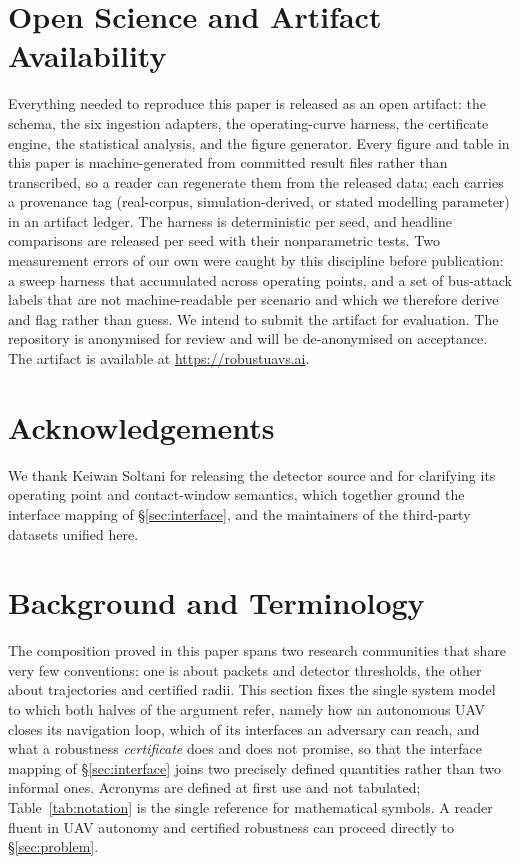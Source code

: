 \section{Open Science and Artifact Availability}
\label{sec:openscience}
Everything needed to reproduce this paper is released as an open artifact: the
schema, the six ingestion adapters, the operating-curve harness, the
certificate engine, the statistical analysis, and the figure generator. Every
figure and table in this paper is machine-generated from committed result files
rather than transcribed, so a reader can regenerate them from the released data;
each carries a provenance tag (real-corpus, simulation-derived, or stated
modelling parameter) in an artifact ledger. The harness is deterministic per
seed, and headline comparisons are released per seed with their nonparametric
tests. Two measurement errors of our own were caught by this discipline before
publication: a sweep harness that accumulated across operating points, and a set
of bus-attack labels that are not machine-readable per scenario and which we
therefore derive and flag rather than guess. We intend to submit the artifact for evaluation.
\ifanon
The repository is anonymised for review and will be de-anonymised on acceptance.
\else
The artifact is available at \url{https://robustuavs.ai}.
\fi

\ifanon\else

\section*{Acknowledgements}
We thank Keiwan Soltani for releasing the  detector source and
for clarifying its operating point and contact-window semantics, which together
ground the interface mapping of \S\ref{sec:interface}, and the maintainers of
the third-party datasets unified here.
\fi




\appendix

\section{Background and Terminology}
\label{sec:background}
The composition proved in this paper spans two research communities that share
very few conventions: one is about packets and detector thresholds, the
other about trajectories and certified radii. This section fixes the single system model to which both halves of the argument refer, namely how an autonomous UAV closes
its navigation loop, which of its interfaces an adversary can reach, and what a
robustness \emph{certificate} does and does not promise, so that the interface
mapping of \S\ref{sec:interface} joins two precisely defined quantities rather
than two informal ones. Acronyms are defined at first use and not tabulated;
Table~\ref{tab:notation} is the single reference for mathematical symbols. A
reader fluent in UAV autonomy and certified robustness can proceed directly to \S\ref{sec:problem}.

